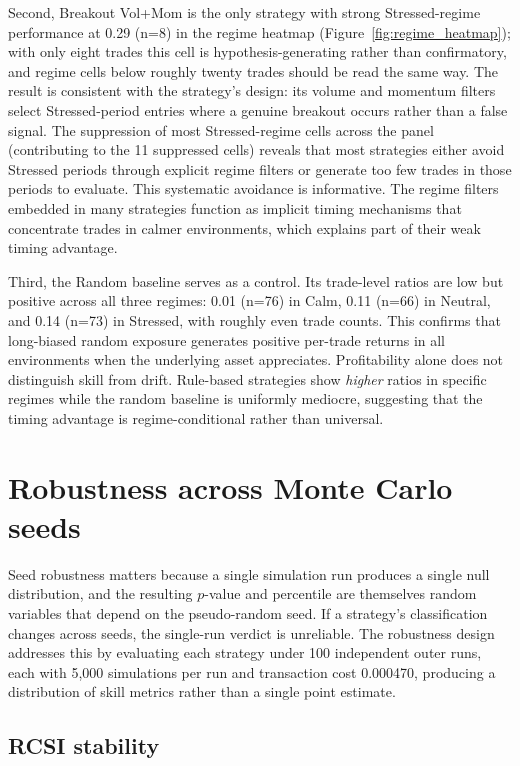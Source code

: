 \documentclass[preprint,12pt]{elsarticle}
\theoremstyle{definition}
\begin{document}
Second, Breakout Vol+Mom is the only strategy with strong Stressed-regime performance at 0.29 (n=8) in the regime heatmap (Figure~\ref{fig:regime_heatmap}); with only eight trades this cell is hypothesis-generating rather than confirmatory, and regime cells below roughly twenty trades should be read the same way. The result is consistent with the strategy's design: its volume and momentum filters select Stressed-period entries where a genuine breakout occurs rather than a false signal. The suppression of most Stressed-regime cells across the panel (contributing to the 11 suppressed cells) reveals that most strategies either avoid Stressed periods through explicit regime filters or generate too few trades in those periods to evaluate. This systematic avoidance is informative. The regime filters embedded in many strategies function as implicit timing mechanisms that concentrate trades in calmer environments, which explains part of their weak timing advantage.

Third, the Random baseline serves as a control. Its trade-level ratios are low but positive across all three regimes: 0.01 (n=76) in Calm, 0.11 (n=66) in Neutral, and 0.14 (n=73) in Stressed, with roughly even trade counts. This confirms that long-biased random exposure generates positive per-trade returns in all environments when the underlying asset appreciates. Profitability alone does not distinguish skill from drift. Rule-based strategies show \emph{higher} ratios in specific regimes while the random baseline is uniformly mediocre, suggesting that the timing advantage is regime-conditional rather than universal.

\section{Robustness across Monte Carlo seeds}

Seed robustness matters because a single simulation run produces a single null distribution, and the resulting $p$-value and percentile are themselves random variables that depend on the pseudo-random seed. If a strategy's classification changes across seeds, the single-run verdict is unreliable. The robustness design addresses this by evaluating each strategy under 100 independent outer runs, each with 5{,}000 simulations per run and transaction cost 0.000470, producing a distribution of skill metrics rather than a single point estimate.

\subsection{RCSI stability}
\end{document}
